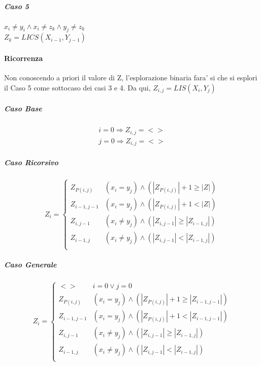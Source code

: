 \subparagraph{Caso 5}

$x_i \ne y_i \land x_i \ne z_k \land y_j \ne z_k$ \\
$Z_k = LICS(X_{i-1}, Y_{j-1})$ \\

\paragraph{Ricorrenza}

Non conoscendo a priori il valore di Z, l'esplorazione binaria fara' si che si esplori il Caso 5 come sottocaso dei casi 3 e 4.
Da qui, $Z_{i,j} = LIS(X_i, Y_j)$

\subparagraph{Caso Base}

\begin{align}
    \text{$i = 0 \Rightarrow Z_{i,j} = <>$} \\
    \text{$j = 0 \Rightarrow Z_{i,j} = <>$}
\end{align}

\subparagraph{Caso Ricorsivo}

\[
    Z_i =
    \begin{cases}
        \text{$Z_{P(i,j)}$} & \text{$(x_i = y_j) \land (|Z_{P(i,j)}| + 1 \geq |Z|)$} \\
        \text{$Z_{i-1, j-1}$} & \text{$(x_i = y_j) \land (|Z_{P(i,j)}| + 1 < |Z|)$} \\
        \text{$Z_{i, j-1}$} & \text{$(x_i \ne y_j) \land (|Z_{i, j-1}| \geq |Z_{i-1, j}|)$} \\
        \text{$Z_{i-1, j}$} & \text{$(x_i \ne y_j) \land (|Z_{i, j-1}| < |Z_{i-1, j}|)$} \\
    \end{cases}
\]

\subparagraph{Caso Generale}

\[
    Z_i =
    \begin{cases}
        \text{$<>$} & \text{$i = 0 \lor j = 0$} \\
        \text{$Z_{P(i,j)}$} & \text{$(x_i = y_j) \land (|Z_{P(i,j)}| + 1 \geq |Z_{i-1, j-1}|)$} \\
        \text{$Z_{i-1, j-1}$} & \text{$(x_i = y_j) \land (|Z_{P(i,j)}| + 1 < |Z_{i-1, j-1}|)$} \\
        \text{$Z_{i, j-1}$} & \text{$(x_i \ne y_j) \land (|Z_{i, j-1}| \geq |Z_{i-1, j}|)$} \\
        \text{$Z_{i-1, j}$} & \text{$(x_i \ne y_j) \land (|Z_{i, j-1}| < |Z_{i-1, j}|)$} \\
    \end{cases}
\]

